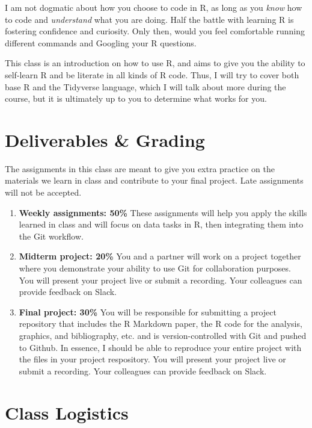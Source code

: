 \documentclass[11pt,]{article}
\begin{document}
I am not dogmatic about how you choose to code in R, as long as you
\emph{know} how to code and \emph{understand} what you are doing. Half
the battle with learning R is fostering confidence and curiosity. Only
then, would you feel comfortable running different commands and Googling
your R questions.

This class is an introduction on how to use R, and aims to give you the
ability to self-learn R and be literate in all kinds of R code. Thus, I
will try to cover both base R and the Tidyverse language, which I will
talk about more during the course, but it is ultimately up to you to
determine what works for you.

\hypertarget{deliverables-grading}{%
\section{Deliverables \& Grading}\label{deliverables-grading}}

The assignments in this class are meant to give you extra practice on
the materials we learn in class and contribute to your final project.
Late assignments will not be accepted.

\begin{enumerate}
\def\labelenumi{\arabic{enumi}.}
\item
  \textbf{Weekly assignments: 50\%} These assignments will help you
  apply the skills learned in class and will focus on data tasks in R,
  then integrating them into the Git workflow.
\item
  \textbf{Midterm project: 20\%} You and a partner will work on a
  project together where you demonstrate your ability to use Git for
  collaboration purposes. You will present your project live or submit a
  recording. Your colleagues can provide feedback on Slack.
\item
  \textbf{Final project: 30\%} You will be responsible for submitting a
  project repository that includes the R Markdown paper, the R code for
  the analysis, graphics, and bibliography, etc. and is
  version-controlled with Git and pushed to Github. In essence, I should
  be able to reproduce your entire project with the files in your
  project respository. You will present your project live or submit a
  recording. Your colleagues can provide feedback on Slack.
\end{enumerate}

\hypertarget{class-logistics}{%
\section{Class Logistics}\label{class-logistics}}
\end{document}
